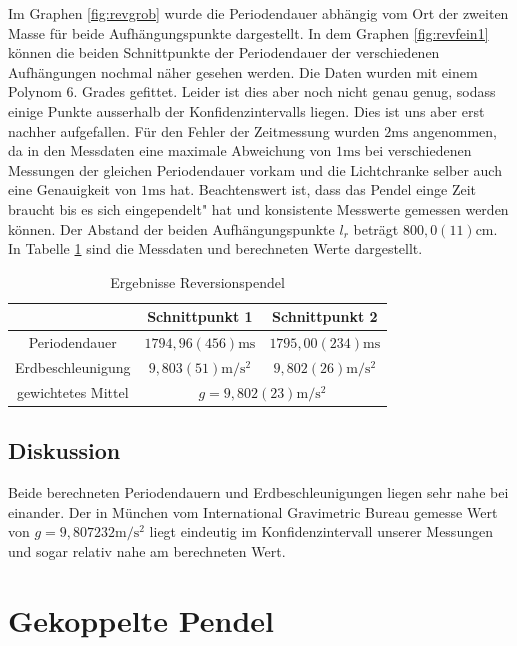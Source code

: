 \documentclass[11pt, a4paper]{article}
\begin{document}
    Im Graphen \ref{fig:revgrob} wurde die Periodendauer abhängig vom Ort der zweiten Masse für beide Aufhängungspunkte dargestellt. 
    In dem Graphen \ref{fig:revfein1}  können die beiden Schnittpunkte der Periodendauer der verschiedenen
    Aufhängungen nochmal näher gesehen werden. Die Daten wurden mit einem Polynom 6. Grades gefittet.
    Leider ist dies aber noch nicht genau genug, sodass einige Punkte ausserhalb
    der Konfidenzintervalls liegen. Dies ist uns aber erst nachher aufgefallen. Für den Fehler der Zeitmessung
    wurden $2 \si{\milli\second}$ angenommen, da in den Messdaten eine maximale Abweichung von $1\si{\milli\second}$ bei verschiedenen Messungen 
    der gleichen Periodendauer vorkam und die Lichtchranke selber auch eine Genauigkeit von $1\si{\milli\second}$ hat.
    Beachtenswert ist, dass das Pendel einge Zeit braucht bis es sich eingependelt" hat und konsistente Messwerte
    gemessen werden können. Der Abstand der beiden Aufhängungspunkte $l_r$ beträgt $800,0(11)\si{\centi\metre}$.
    In Tabelle \ref{ergrev} sind die Messdaten und berechneten Werte dargestellt. 

    \begin{table}
        \centering
        \begin{tabular}{c c c}
            & Schnittpunkt 1 & Schnittpunkt 2 \\ \hline
            Periodendauer &  $1794,96(456)\si{\milli\second} $ & $1795,00(234)\si{\milli\second} $ \\
            Erdbeschleunigung & $9,803(51)\si{\metre\per\second\squared}$ & $9,802(26)\si{\metre\per\second\squared}$ \\
            gewichtetes Mittel & \multicolumn{2}{c}{$g = 9,802(23)\si{\metre\per\square\second}$}
        \end{tabular}
        \caption{Ergebnisse Reversionspendel}
        \label{ergrev}
    \end{table}

    \subsection{Diskussion}
    Beide berechneten Periodendauern und Erdbeschleunigungen liegen sehr nahe bei einander.
    Der in München vom International Gravimetric Bureau gemesse Wert von $g = 9,807232\si{\metre\per\second\squared}$ \cite{glit} liegt
    eindeutig im Konfidenzintervall unserer Messungen und sogar relativ nahe am berechneten Wert.


    \section{Gekoppelte Pendel}
\end{document}
